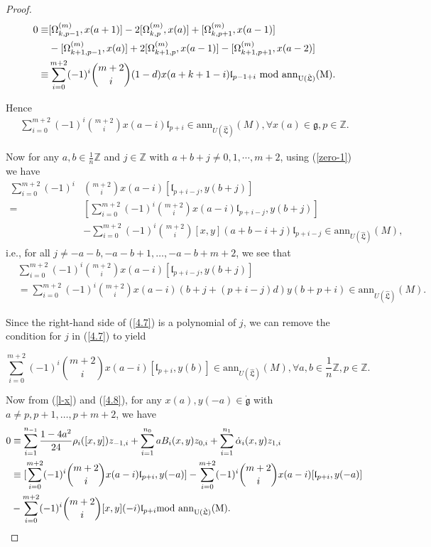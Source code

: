 \documentclass[1p]{elsarticle}
\numberwithin{equation}{section}
\def\dg{\dot{\mathfrak{g}}}
\def\fg{\mathfrak{g}}
\def\fL{\mathfrak{L}}
\def\mod{\rm mod\,\,}
\def\bZ{\mathbb{Z}}
\def\ann{\mathrm{ann}}
\def\fl{\mathfrak{l}}
\def\hL{\hat{\fL}}
\begin{document}
\begin{proof}
\begin{align}
0\equiv& [\Omega_{k,p-1}^{(m)},x(a+1)]-2[\Omega_{k,p}^{(m)},x(a)]+[\Omega_{k,p+1}^{(m)},x(a-1)]\nonumber\\
&-[\Omega_{k+1,p-1}^{(m)},x(a)]+2[\Omega_{k+1,p}^{(m)},x(a-1)]-[\Omega_{k+1,p+1}^{(m)},x(a-2)]\nonumber\\
\equiv &\sum\limits_{i=0}^{m+2}(-1)^i\binom{m+2}{i}(1-d)x(a+k+1-i)\fl_{p-1+i}\,\,\mod \ann_{U(\hL)}(M)\nonumber.
\end{align}

Hence \begin{align}\label{l-x}\sum\limits_{i=0}^{m+2}(-1)^i\binom{m+2}{i}x(a-i)\fl_{p+i}\in \ann_{U(\hL)}(M),\forall x(a)\in \fg,p\in \bZ.\end{align}

Now for any $a,b\in \frac1n\bZ$ and $j\in\bZ$  with $a+b+j\ne 0,1,\cdots, m+2$, using (\ref{zero-1}) we have
$$\begin{aligned}\sum\limits_{i=0}^{m+2}(-1)^i&\binom{m+2}{i}x(a-i)[\fl_{p+i-j},y(b+j)]\\
	=&[\sum\limits_{i=0}^{m+2}(-1)^i\binom{m+2}{i}x(a-i)\fl_{p+i-j},y(b+j)]\\
	&-\sum\limits_{i=0}^{m+2}(-1)^i\binom{m+2}{i}[x,y](a+b-i+j)\fl_{p+i-j}\in \ann_{U(\hL)}(M),\end{aligned}$$
	i.e., for all $j\ne -a-b,-a-b+1,\ldots,-a-b+m+2$,
we see that
\begin{align}&\sum\limits_{i=0}^{m+2}(-1)^i\binom{m+2}{i}x(a-i)[\fl_{p+i-j},y(b+j)]\nonumber \\&=\sum\limits_{i=0}^{m+2}(-1)^i\binom{m+2}{i}x(a-i)(b+j+(p+i-j)d)y(b+p+i)\in  \ann_{U(\hL)}(M)\label{4.7}.\end{align}

Since the right-hand side of (\ref{4.7}) is a polynomial of $j$, we can remove the condition for $j$ in (\ref{4.7}) to yield 

\begin{equation}\label{4.8}\sum\limits_{i=0}^{m+2}(-1)^i\binom{m+2}{i}x(a-i)[\fl_{p+i},y(b)]\in  \ann_{U(\hL)}(M), \forall a, b\in  \frac1n\bZ,  p\in\bZ.\end{equation}
 
Now from (\ref{l-x}) and (\ref{4.8}), for any $x(a),y(-a)\in \dg$ with $a\ne p,p+1,\ldots,p+m+2$,  we have  \begin{align*}0&\equiv \sum_{i=1}^{n_{-1}}\frac{1-4a^2}{24}\rho_i([x,y])z_{-1,i}+\sum_{i=1}^{n_0} a B_i(x,y)z_{0,i}+\sum_{i=1}^{n_1}\dot\alpha_i(x,y)z_{1,i}\\ &\equiv [\sum\limits_{i=0}^{m+2}(-1)^i\binom{m+2}{i}x(a-i)\fl_{p+i},y(-a)]-\sum\limits_{i=0}^{m+2}(-1)^i\binom{m+2}{i}x(a-i)[\fl_{p+i},y(-a)]
\\ &-\sum\limits_{i=0}^{m+2}(-1)^i\binom{m+2}{i}[x,y](-i)\fl_{p+i}\mod \ann_{U(\hL)}(M).\end{align*}


\end{proof}
\end{document}
